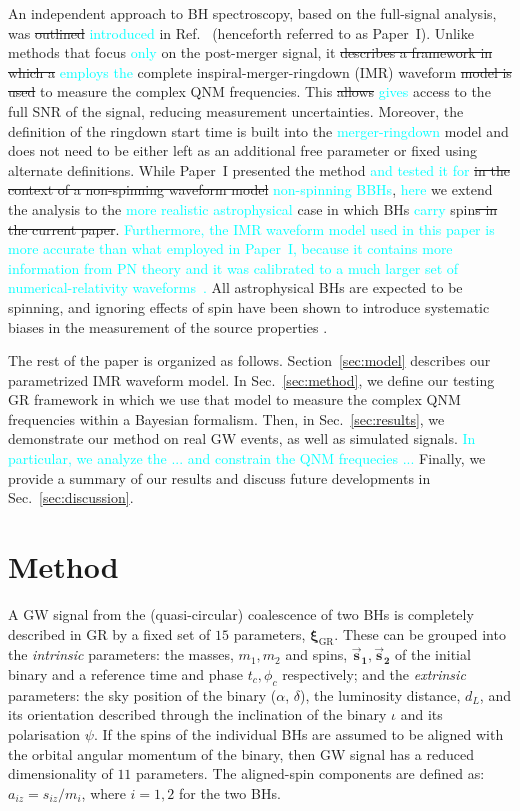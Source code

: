 \documentclass[twocolumn,prd,superscriptaddress,amsfonts,amssymb,amsmath,preprintnumbers]{revtex4-1}
\newcommand{\paperone}{Paper~I\xspace}
\newcommand{\ab}[1]{\textcolor{cyan}{#1}}
\newcommand{\bxigr}{\bm{\xi}_{\text{GR}}}
\newcommand{\bs}[1]{\bm{\vec{s}_{#1}}}
\begin{document}
An independent approach to BH spectroscopy, based on the full-signal
analysis, was \sout{outlined} \ab{introduced} in Ref.~\citep{Brito:2018rfr} 
(henceforth referred to as \paperone). Unlike methods that focus \ab{only} 
on the post-merger signal, it \sout{describes a framework in which a} 
\ab{employs the} complete inspiral-merger-ringdown
(IMR) waveform \sout{model is used} to measure the complex QNM
frequencies. This \sout{allows} \ab{gives} access to the full SNR of the signal,
reducing measurement uncertainties. Moreover, the definition of the
ringdown start time is built into the \ab{merger-ringdown} model and does not need to be
either left as an additional free parameter or fixed using alternate
definitions. While \paperone presented the method \ab{and tested it for }\sout{in the context of a
non-spinning waveform model} \ab{non-spinning BBHs}, \ab{here} we extend the analysis to the \ab{more 
realistic astrophysical} case in which BHs \ab{carry} spin\sout{s in the current paper}. \ab{Furthermore, 
the IMR waveform model used in this paper is more accurate than what employed in \paperone, 
because it contains more information from PN theory and it was calibrated to a much larger set 
of numerical-relativity waveforms~\cite{Bohe:2016gbl}.}  All astrophysical BHs are expected to be spinning, 
and ignoring effects of spin have been shown to introduce systematic biases in the measurement of the 
source properties \cite{paper_showing_systematics_from_ignoring_spin}.

The rest of the paper is organized as follows. Section~\ref{sec:model} describes our parametrized IMR
waveform model. In Sec.~\ref{sec:method}, we define our testing GR  framework in which we use that model 
to measure the complex QNM frequencies within a Bayesian formalism. Then, in Sec.~\ref{sec:results}, 
we demonstrate our method on real GW events, as well as simulated signals. \ab{In particular, we analyze 
the ... and constrain the QNM frequecies ...} Finally, we provide a summary of
our results and discuss future developments in Sec.~\ref{sec:discussion}.

\section{Method}

A GW signal from the (quasi-circular) coalescence of two BHs is completely described in GR by a fixed set of $15$ parameters, $\bxigr$. These can be grouped into the \emph{intrinsic} parameters: the masses, $m_1, m_2$ and spins, $\bs1, \bs2$ of the initial binary and a reference time and phase $t_c, \phi_c$ respectively; and the \emph{extrinsic} parameters: the sky position of the binary ($\alpha$, $\delta$), the luminosity distance, $d_L$, and its orientation described through the inclination of the binary $\iota$ and its polarisation $\psi$. If the spins of the individual BHs are assumed to be aligned with the orbital angular momentum of the binary, then GW signal has a reduced dimensionality of $11$ parameters. The aligned-spin components are defined as: $a_{iz} = s_{iz}/m_i$, where $i=1,2$ for the two BHs.
\end{document}
